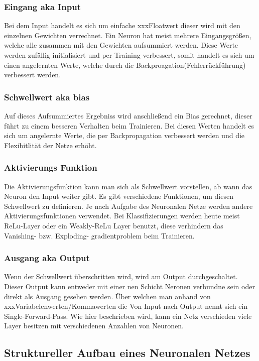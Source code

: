 \subsubsection{Eingang aka Input}
Bei dem Input handelt es sich um einfache xxxFloatwert dieser wird mit den einzelnen Gewichten verrechnet. Ein Neuron hat meist mehrere Eingangsgrößen, welche alle zusammen mit den Gewichten aufsummiert werden. Diese Werte werden zufällig initialisiert und per Training verbessert, somit handelt es sich um einen angelernten Werte, welche durch die Backproagation(Fehlerrückführung) verbessert werden.

\subsubsection{Schwellwert aka bias}
Auf dieses Aufsummiertes Ergebniss wird anschließend ein Bias gerechnet, dieser führt zu einem besseren Verhalten beim Trainieren. Bei diesen Werten handelt es sich um angelernte Werte, die per Backpropagation verbessert werden und die Flexibitlität der Netze erhöht.


\subsubsection{Aktivierungs Funktion}
Die Aktivierungsfunktion kann man sich als Schwellwert vorstellen, ab wann das Neuron den Input weiter gibt. Es gibt verschiedene Funktionen, um diesen Schwellwert zu definieren. Je nach Aufgabe des Neuronalen Netze werden andere Aktivierungsfunktionen verwendet. Bei Klassifizierungen werden heute meist ReLu-Layer oder ein Weakly-ReLu Layer benutzt, diese verhindern das Vanishing- bzw. Exploding- gradientproblem beim Trainieren.

\subsubsection{Ausgang aka Output}
Wenn der Schwellwert überschritten wird, wird am Output durchgeschaltet. Dieser Output kann entweder mit einer nen Schicht Neronen verbundne sein oder direkt als Ausgang gesehen werden. Über welchen man anhand von xxxVariabelenwerten/Kommawerten die 
Von Input nach Output nennt sich ein Single-Forward-Pass. Wie hier beschrieben wird, kann ein Netz verschieden viele Layer besitzen mit verschiedenen Anzahlen von Neuronen.

\subsection{Struktureller Aufbau eines Neuronalen Netzes}

